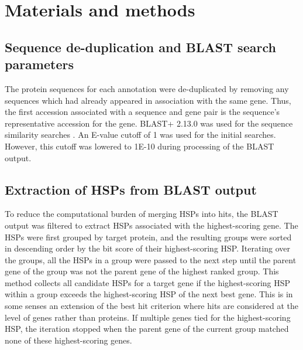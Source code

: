 \documentclass[10pt,letterpaper]{article}
\begin{document}
\section*{Materials and methods}
\subsection*{Sequence de-duplication and BLAST search parameters}
The protein sequences for each annotation were de-duplicated by removing any sequences which had already appeared in association with the same gene. Thus, the first accession associated with a sequence and gene pair is the sequence’s representative accession for the gene. BLAST+ 2.13.0 was used for the sequence similarity searches \cite{Camacho2009}. An E-value cutoff of 1 was used for the initial searches. However, this cutoff was lowered to 1E-10 during processing of the BLAST output.

\subsection*{Extraction of HSPs from BLAST output}
To reduce the computational burden of merging HSPs into hits, the BLAST output was filtered to extract HSPs associated with the highest-scoring gene. The HSPs were first grouped by target protein, and the resulting groups were sorted in descending order by the bit score of their highest-scoring HSP. Iterating over the groups, all the HSPs in a group were passed to the next step until the parent gene of the group was not the parent gene of the highest ranked group. This method collects all candidate HSPs for a target gene if the highest-scoring HSP within a group exceeds the highest-scoring HSP of the next best gene. This is in some senses an extension of the best hit criterion where hits are considered at the level of genes rather than proteins. If multiple genes tied for the highest-scoring HSP, the iteration stopped when the parent gene of the current group matched none of these highest-scoring genes.
\end{document}
